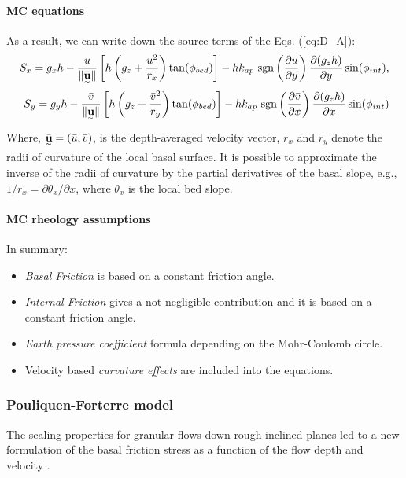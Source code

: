 \documentclass{article}
\begin{document}
\paragraph{MC equations} As a result, we can write down the source terms of the Eqs. (\ref{eq:D_A}):
\begin{eqnarray}
S_x = g_x h  - \frac{\bar{u}}{\| \underset{^\sim}{\bar{\textbf u}} \|} \left[h\left(g_z+\frac{\bar{u}^2}{r_x}\right)\tan(\phi_{bed})\right] - h k_{ap} \ {\rm sgn}\left(\frac{\partial \bar{u}}{\partial y}\right) \frac{\partial (g_z h)}{\partial y} \sin(\phi_{int}),\nonumber \\
S_y = g_y h  - \frac{\bar{v}}{\| \underset{^\sim}{\bar{\textbf u}} \|} \left[h\left(g_z +\frac{\bar{v}^2}{r_y}\right)\tan(\phi_{bed})\right] - h k_{ap} \ {\rm sgn}\left({\frac{\partial \bar{v}}{\partial x}}\right) \frac{\partial (g_z h)}{\partial x} \sin(\phi_{int})
\end{eqnarray}
Where, $\underset{^\sim}{\bar{\textbf u}} = (\bar{u} , \bar{v})$, is the depth-averaged velocity vector, $r_x$ and $r_y$ denote the radii of curvature
of the local basal surface. It is possible to approximate the inverse of the radii of curvature by the partial derivatives of the basal slope, e.g., $1/r_x = \partial \theta_x/\partial x$, where $\theta_x$ is the local bed slope.

\paragraph{MC rheology assumptions} In summary:
\begin{itemize}
\item \textit{Basal Friction} is based on a constant friction angle.

\item \textit{Internal Friction} gives a not negligible contribution and it is based on a constant friction angle.

\item \textit{Earth pressure coefficient} formula depending on the Mohr-Coulomb circle.

\item Velocity based \textit{curvature effects} are included into the equations.
\end{itemize}

\subsubsection{Pouliquen-Forterre model}\label{PFM}
The scaling properties for granular flows down rough inclined planes led to a new formulation of the basal friction stress as a function of the flow depth and velocity \cite{Pouliquen1999}.
\end{document}
